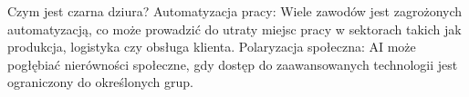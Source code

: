 \begin{frame}{Czym jest czarna dziura?}
Automatyzacja pracy: Wiele zawodów jest zagrożonych automatyzacją, co może prowadzić do utraty miejsc pracy w sektorach takich jak produkcja, logistyka czy obsługa klienta.
Polaryzacja społeczna: AI może pogłębiać nierówności społeczne, gdy dostęp do zaawansowanych technologii jest ograniczony do określonych grup.
\end{frame}
